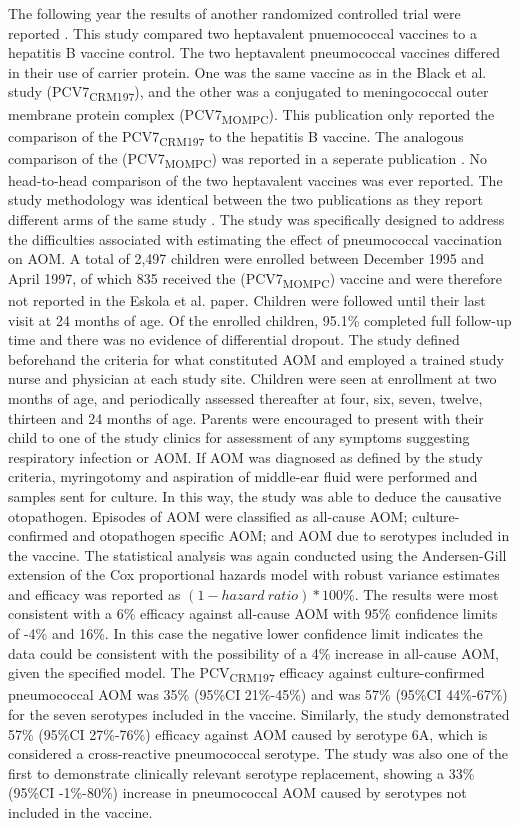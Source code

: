 \documentclass[]{book}
\theoremstyle{definition}
\theoremstyle{definition}
\theoremstyle{definition}
\theoremstyle{remark}
\begin{document}
The following year the results of another randomized controlled trial
were reported \citep{Eskola2001}. This study compared two heptavalent
pnuemococcal vaccines to a hepatitis B vaccine control. The two
heptavalent pneumococcal vaccines differed in their use of carrier
protein. One was the same vaccine as in the Black et al. study
(PCV7\textsubscript{CRM197}), and the other was a conjugated to
meningococcal outer membrane protein complex
(PCV7\textsubscript{MOMPC}). This publication only reported the
comparison of the PCV7\textsubscript{CRM197} to the hepatitis B vaccine.
The analogous comparison of the (PCV7\textsubscript{MOMPC}) was reported
in a seperate publication \citep{Kilpi2003}. No head-to-head comparison
of the two heptavalent vaccines was ever reported. The study methodology
was identical between the two publications as they report different arms
of the same study \citep{Eskola2001, Kilpi2003}. The study was
specifically designed to address the difficulties associated with
estimating the effect of pneumococcal vaccination on AOM. A total of
2,497 children were enrolled between December 1995 and April 1997, of
which 835 received the (PCV7\textsubscript{MOMPC}) vaccine and were
therefore not reported in the Eskola et al. paper. Children were
followed until their last visit at 24 months of age. Of the enrolled
children, 95.1\% completed full follow-up time and there was no evidence
of differential dropout. The study defined beforehand the criteria for
what constituted AOM and employed a trained study nurse and physician at
each study site. Children were seen at enrollment at two months of age,
and periodically assessed thereafter at four, six, seven, twelve,
thirteen and 24 months of age. Parents were encouraged to present with
their child to one of the study clinics for assessment of any symptoms
suggesting respiratory infection or AOM. If AOM was diagnosed as defined
by the study criteria, myringotomy and aspiration of middle-ear fluid
were performed and samples sent for culture. In this way, the study was
able to deduce the causative otopathogen. Episodes of AOM were
classified as all-cause AOM; culture-confirmed and otopathogen specific
AOM; and AOM due to serotypes included in the vaccine. The statistical
analysis was again conducted using the Andersen-Gill extension of the
Cox proportional hazards model with robust variance estimates and
efficacy was reported as \((1 - hazard\ ratio) *100\%\). The results
were most consistent with a 6\% efficacy against all-cause AOM with 95\%
confidence limits of -4\% and 16\%. In this case the negative lower
confidence limit indicates the data could be consistent with the
possibility of a 4\% increase in all-cause AOM, given the specified
model. The PCV\textsubscript{CRM197} efficacy against culture-confirmed
pneumococcal AOM was 35\% (95\%CI 21\%-45\%) and was 57\% (95\%CI
44\%-67\%) for the seven serotypes included in the vaccine. Similarly,
the study demonstrated 57\% (95\%CI 27\%-76\%) efficacy against AOM
caused by serotype 6A, which is considered a cross-reactive pneumococcal
serotype. The study was also one of the first to demonstrate clinically
relevant serotype replacement, showing a 33\% (95\%CI -1\%-80\%)
increase in pneumococcal AOM caused by serotypes not included in the
vaccine.
\end{document}
